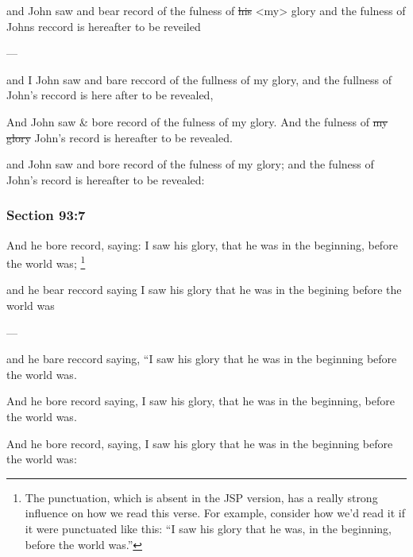 		\begin{framed}
		\scriptsize
			\begin{compactdesc}
				\item[JSP] and John saw and bear record of the fulness of \sout{his} <my> glory and the fulness of Johns reccord is hereafter to be reveiled
				\item[BC] ---
				\item[RB2] and I John saw and bare reccord of the fullness of my glory, and the fullness of John's reccord is here after to be revealed, 
				\item[RB1] And John saw \& bore record of the fulness of my glory. And the fulness of \sout{my glory} John's record is hereafter to be revealed. 
				\item[DC 1835] and John saw and bore record of the fulness of my glory; and the fulness of John’s record is hereafter to be revealed: 
			\end{compactdesc}
		\end{framed}

	\subsubsection{Section 93:7} %
		\label{DC93-7}

		And he bore record, saying: I saw his glory, that he was in the beginning, before the world was;%
			\footnote{%
				The punctuation, which is absent in the JSP version, has a really strong influence on how we read this verse. For example, consider how we'd read it if it were punctuated like this: ``I saw his glory that he was, in the beginning, before the world was.''
				}

		\begin{framed}
		\scriptsize
			\begin{compactdesc}
				\item[JSP] and he bear reccord saying I saw his glory that he was in the begining before the world was
				\item[BC] ---
				\item[RB2] and he bare reccord saying, ``I saw his glory that he was in the beginning before the world was. 
				\item[RB1] And he bore record saying, I saw his glory, that he was in the beginning, before the world was. 
				\item[DC 1835] And he bore record, saying, I saw his glory that he was in the beginning before the world was: 
			\end{compactdesc}
		\end{framed}

